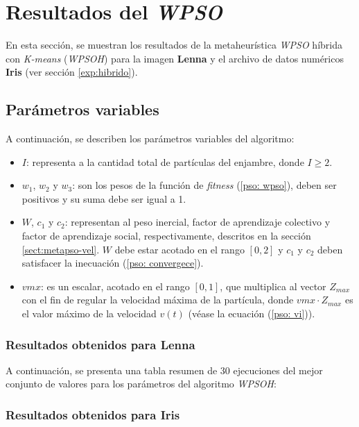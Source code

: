 \section{Resultados del \emph{WPSO}}

    En esta sección, se muestran los resultados de la metaheurística \emph{WPSO}
híbrida con \emph{K-means} (\emph{WPSOH\-}) para la imagen \textbf{Lenna}
y el archivo de datos numéricos \textbf{Iris} (ver sección \ref{exp:hibrido}).

\subsection{Parámetros variables}\label{sect:iwpso-pv}

    A continuación, se describen los parámetros variables del algoritmo:
\begin{itemize}
    \item $I$: representa a la cantidad total de partículas del enjambre,
donde $I \geq 2$.
    \item $w_1$, $w_2$ y $w_3$: son los pesos de la función de \emph{fitness}
(\ref{pso: wpso}), deben ser positivos y su suma debe ser igual a 1.
    \item $W$, $c_1$ y $c_2$: representan al peso inercial, factor de aprendizaje
colectivo y factor de aprendizaje social, respectivamente, descritos en la
sección \ref{sect:metapso-vel}. $W$ debe estar acotado en el rango $[0, 2]$ y
$c_1$ y $c_2$ deben satisfacer la inecuación (\ref{pso: convergece}).
    \item $vmx$: es un escalar, acotado en el rango $[0, 1]$, que multiplica al
vector $Z_{max}$ con el fin de regular la velocidad máxima de la partícula,
donde $vmx \cdot Z_{max}$ es el valor máximo de la velocidad $v(t)$ (véase la
ecuación (\ref{pso: vi})).
\end{itemize}

\subsubsection{Resultados obtenidos para \textbf{Lenna}}
    A continuación, se presenta una tabla resumen de 30 ejecuciones del mejor
conjunto de valores para los parámetros del algoritmo \emph{WPSOH}:



\subsubsection{Resultados obtenidos para \textbf{Iris}}

